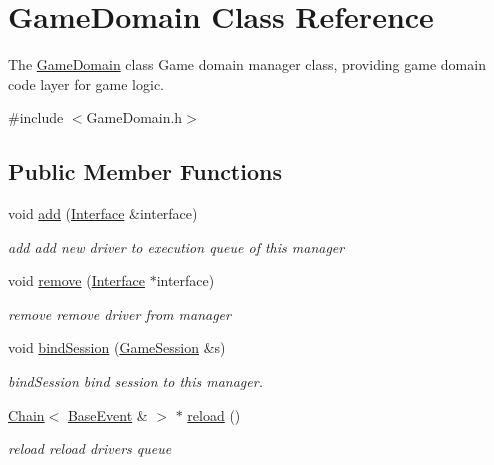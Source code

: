 \hypertarget{classGameDomain}{}\section{Game\+Domain Class Reference}
\label{classGameDomain}


The \hyperlink{classGameDomain}{Game\+Domain} class Game domain manager class, providing game domain code layer for game logic.  




{\ttfamily \#include $<$Game\+Domain.\+h$>$}

\subsection*{Public Member Functions}
\begin{DoxyCompactItemize}
\item 
void \hyperlink{classGameDomain_af4426ea0c66b01e5c573becf180e7fb3}{add} (\hyperlink{classInterface}{Interface} \&interface)
\begin{DoxyCompactList}\small\item\em add add new driver to execution queue of this manager \end{DoxyCompactList}\item 
void \hyperlink{classGameDomain_a77944f3e82e8f492c523586dd1ce0674}{remove} (\hyperlink{classInterface}{Interface} $\ast$interface)
\begin{DoxyCompactList}\small\item\em remove remove driver from manager \end{DoxyCompactList}\item 
void \hyperlink{classGameDomain_a8326ffd8483813cd617c13e6d8e0dbfc}{bind\+Session} (\hyperlink{classGameSession}{Game\+Session} \&s)
\begin{DoxyCompactList}\small\item\em bind\+Session bind session to this manager. \end{DoxyCompactList}\item 
\hyperlink{classChain}{Chain}$<$ \hyperlink{classBaseEvent}{Base\+Event} \& $>$ $\ast$ \hyperlink{classGameDomain_a9d8996f5abf6019a7a396c1854a3b8eb}{reload} ()
\begin{DoxyCompactList}\small\item\em reload reload drivers queue \end{DoxyCompactList}\end{DoxyCompactItemize}


